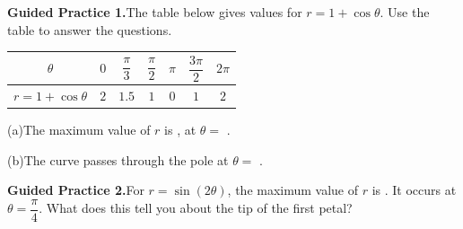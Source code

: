 \documentclass[10pt]{article}
\begin{document}
\begin{practicebox}

\textbf{Guided Practice 1.}\quad The table below gives values for $r = 1 + \cos\theta$.
Use the table to answer the questions.

\vspace{4pt}
\renewcommand{\arraystretch}{1.5}
\begin{tabular}{|c|c|c|c|c|c|c|}
\hline
$\theta$ & $0$ & $\dfrac{\pi}{3}$ & $\dfrac{\pi}{2}$ & $\pi$ & $\dfrac{3\pi}{2}$ & $2\pi$ \\
\hline
$r = 1 + \cos\theta$ & $2$ & $1.5$ & $1$ & $0$ & $1$ & $2$ \\
\hline
\end{tabular}

\vspace{6pt}
(a)\quad The maximum value of $r$ is \underline{\hspace{1cm}}, at $\theta = $ \underline{\hspace{1.5cm}}.

\vspace{4pt}
(b)\quad The curve passes through the pole at $\theta = $ \underline{\hspace{1.5cm}}.

\vspace{0.10in}
\textbf{Guided Practice 2.}\quad For $r = \sin(2\theta)$, the maximum value of $r$ is
\underline{\hspace{0.8cm}}. It occurs at $\theta = \dfrac{\pi}{4}$.
What does this tell you about the tip of the first petal? \writeline

\end{practicebox}
\end{document}
